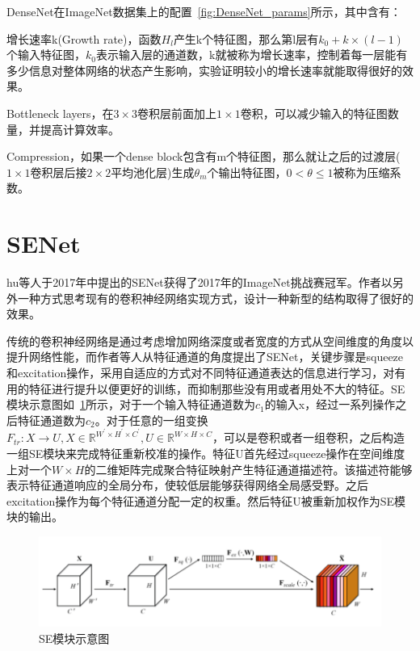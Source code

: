 DenseNet在ImageNet数据集上的配置~\ref{fig:DenseNet_params}所示，其中含有：

增长速率k(Growth rate)，函数$H_l$产生k个特征图，那么第l层有$k_0+k\times(l-1)$个输入特征图，$k_0$表示输入层的通道数，k就被称为增长速率，控制着每一层能有多少信息对整体网络的状态产生影响，实验证明较小的增长速率就能取得很好的效果。

Bottleneck layers，在$3\times3$卷积层前面加上$1\times1$卷积，可以减少输入的特征图数量，并提高计算效率。

Compression，如果一个dense block包含有m个特征图，那么就让之后的过渡层($1\times1$卷积层后接$2\times2$平均池化层)生成$\theta_m$个输出特征图，$0<\theta\leq1$被称为压缩系数。

\section{SENet}

hu等人\cite{hu2018squeeze}于2017年中提出的SENet获得了2017年的ImageNet挑战赛冠军。作者以另外一种方式思考现有的卷积神经网络实现方式，设计一种新型的结构取得了很好的效果。

传统的卷积神经网络是通过考虑增加网络深度或者宽度的方式从空间维度的角度以提升网络性能，而作者等人从特征通道的角度提出了SENet，关键步骤是squeeze和excitation操作，采用自适应的方式对不同特征通道表达的信息进行学习，对有用的特征进行提升以便更好的训练，而抑制那些没有用或者用处不大的特征。SE模块示意图如~\ref{fig:SENet_SE_module}所示，对于一个输入特征通道数为$c_1$的输入x，经过一系列操作之后特征通道数为$c_2$。对于任意的一组变换$F_{tr}:X \rightarrow U, X \in \mathbb{R}^{W^\prime \times H^\prime \times C^\prime}, U \in \mathbb{R}^{W \times H \times C}$，可以是卷积或者一组卷积，之后构造一组SE模块来完成特征重新校准的操作。特征U首先经过squeeze操作在空间维度上对一个$W \times H$的二维矩阵完成聚合特征映射产生特征通道描述符。该描述符能够表示特征通道响应的全局分布，使较低层能够获得网络全局感受野。之后excitation操作为每个特征通道分配一定的权重。然后特征U被重新加权作为SE模块的输出。

\begin{figure}[htbp!]
	\centering
	\includegraphics[width=\linewidth]{readings_figures/Squeeze_and_Excitation_module.png}
	\caption{SE模块示意图}
	\label{fig:SENet_SE_module}
\end{figure}

